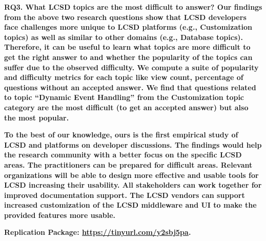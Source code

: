 \nd\bf{RQ3. What  LCSD topics are the most difficult to answer?} Our findings from the above two research questions show that  LCSD developers face challenges more unique to  LCSD platforms (e.g., Customization topics) as well as similar to other domains (e.g., Database topics). Therefore, 
it can be useful to learn what topics are more difficult to get the right answer to and whether the popularity of the topics can suffer due to the observed difficulty. We compute a suite of popularity and difficulty metrics for each topic like view count, percentage of questions without an accepted answer. We find that questions related to topic ``Dynamic Event Handling'' from the Customization topic category are the most difficult (to get an accepted answer) but also the most popular. 
    
    
\bf{To the best of our knowledge, ours is the first empirical study of  LCSD and platforms on developer discussions}. 
The findings would help
the research community with a better focus on the specific  LCSD areas. The practitioners can be prepared for difficult areas. Relevant
organizations will be able to design more effective and usable tools for  LCSD increasing their usability.  All stakeholders can work together for improved documentation support. The  LCSD vendors can support increased customization of the  LCSD middleware and UI to make the provided features more usable. 

\nd\bf{Replication Package}: \url{https://tinyurl.com/y2sbj5pa}. 
    
